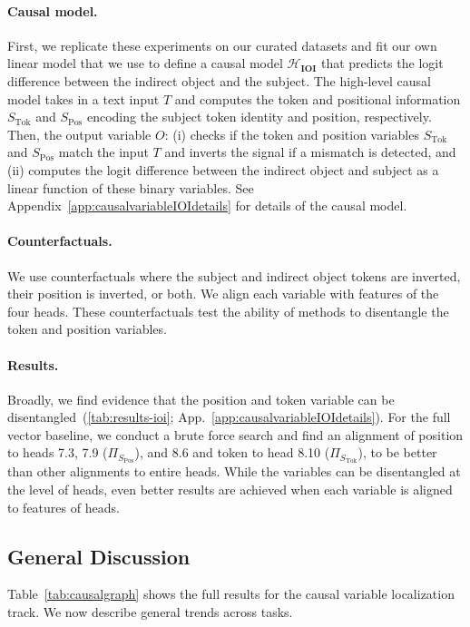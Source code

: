 \documentclass{article}
\theoremstyle{plain}
\theoremstyle{definition}
\theoremstyle{remark}
\newcommand{\variabletrack}{causal variable localization track}
\newcommand{\token}{S_{\text{Tok}}}
\newcommand{\position}{S_{\text{Pos}}}
\newcommand{\inputvar}{T}
\newcommand{\outputvar}{O}
\begin{document}
\paragraph{Causal model.} First, we replicate these experiments on our curated datasets and fit our own linear model that we use to define a causal model $\mathcal{H}_{\mathbf{IOI}}$ that predicts the logit difference between the indirect object and the subject. The high-level causal model takes in a text input $\inputvar$ and computes the token and positional information $\token$ and $\position$ encoding the subject token identity and position, respectively. Then, the output variable $\outputvar$: (i) checks if the token and position variables $\token$ and $\position$ match the input $\inputvar$ and inverts the signal if a mismatch is detected, and (ii) computes the logit difference between the indirect object and subject as a linear function of these binary variables. See Appendix~\ref{app:causalvariableIOIdetails} for details of the causal model.

\paragraph{Counterfactuals.} We use counterfactuals where the subject and indirect object tokens are inverted, their position is inverted, or both. We align each variable with features of the four heads. These counterfactuals test the ability of methods to disentangle the token and position variables.

\paragraph{Results.} Broadly, we find evidence that the position and token variable can be disentangled~(\cref{tab:results-ioi}; App.~\ref{app:causalvariableIOIdetails}). For the full vector baseline, we conduct a brute force search and find an alignment of position to heads 7.3, 7.9 ($\Pi_{\position}$), and 8.6 and token to head 8.10 ($\Pi_{\token}$), to be better than other alignments to entire heads. While the variables can be disentangled at the level of heads, even better results are achieved when each variable is aligned to features of heads.

\subsection{General Discussion} 
Table~\ref{tab:causalgraph} shows the full results for the \variabletrack. We now describe general trends across tasks.
\end{document}
